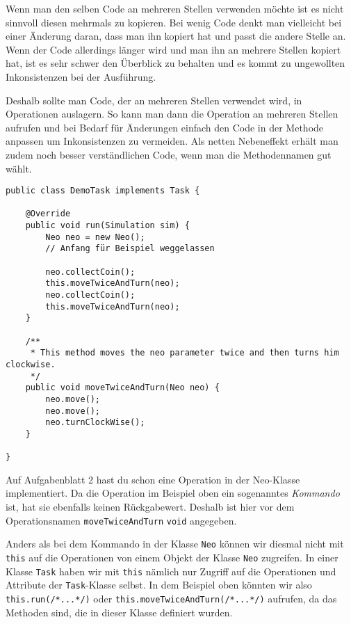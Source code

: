 \begin{Infobox}
	Wenn man den selben Code an mehreren Stellen verwenden möchte ist es nicht sinnvoll diesen mehrmals zu kopieren.
	Bei wenig Code denkt man vielleicht bei einer Änderung daran, dass man ihn kopiert hat und passt die andere Stelle an.
	Wenn der Code allerdings länger wird und man ihn an mehrere Stellen kopiert hat, ist es sehr schwer den Überblick zu behalten und es kommt zu ungewollten Inkonsistenzen bei der Ausführung.\newline

	Deshalb sollte man Code, der an mehreren Stellen verwendet wird, in Operationen auslagern.
	So kann man dann die Operation an mehreren Stellen aufrufen und bei Bedarf für Änderungen einfach den Code in der Methode anpassen um Inkonsistenzen zu vermeiden.
	Als netten Nebeneffekt erhält man zudem noch besser verständlichen Code, wenn man die Methodennamen gut wählt.

	\begin{lstlisting}[xleftmargin=0.5cm]
public class DemoTask implements Task {

    @Override
    public void run(Simulation sim) {
        Neo neo = new Neo();
        // Anfang für Beispiel weggelassen

        neo.collectCoin();
        this.moveTwiceAndTurn(neo);
        neo.collectCoin();
        this.moveTwiceAndTurn(neo);
    }

    /**
	 * This method moves the neo parameter twice and then turns him clockwise.
	 */
    public void moveTwiceAndTurn(Neo neo) {
        neo.move();
        neo.move();
        neo.turnClockWise();
    }

}
	\end{lstlisting}

	Auf Aufgabenblatt 2 hast du schon eine Operation in der Neo-Klasse implementiert.
	Da die Operation im Beispiel oben ein sogenanntes \textit{Kommando} ist, hat sie ebenfalls keinen Rückgabewert.
	Deshalb ist hier vor dem Operationsnamen \lstinline{moveTwiceAndTurn} \lstinline{void} angegeben.\newline

	Anders als bei dem Kommando in der Klasse \lstinline{Neo} können wir diesmal nicht mit \lstinline{this} auf die Operationen von einem Objekt der Klasse \lstinline{Neo} zugreifen.
	In einer Klasse \lstinline{Task} haben wir mit \lstinline{this} nämlich nur Zugriff auf die Operationen und Attribute der \lstinline{Task}-Klasse selbst.
	In dem Beispiel oben könnten wir also \lstinline{this.run(/*...*/)} oder \lstinline{this.moveTwiceAndTurn(/*...*/)} aufrufen, da das Methoden sind, die in dieser Klasse definiert wurden.\newline


\end{Infobox}
